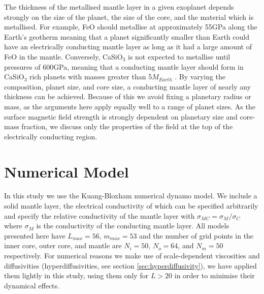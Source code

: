 The thickness of the metallised mantle layer in a given exoplanet depends strongly on the size of the planet, the size of the core, and the material which is metallised. For example, FeO should metallise at approximately 55GPa along the Earth's geotherm \citep{ohta2012} meaning that a planet significantly smaller than Earth could have an electrically conducting mantle layer as long as it had a large amount of FeO in the mantle. Conversely, CaSiO$_{3}$ is not expected to metallise until pressures of 600GPa, meaning that a conducting mantle layer should form in CaSiO$_{3}$ rich planets with masses greater than 5$M_{Earth}$ \citep{tsuchiya2011}. By varying the composition, planet size, and core size, a conducting mantle layer of nearly any thickness can be achieved. Because of this we avoid fixing a planetary radius or mass, as the arguments here apply equally well to a range of planet sizes. As the surface magnetic field strength is strongly dependent on planetary size and core-mass fraction, we discuss only the properties of the field at the top of the electrically conducting region.
 
\section{Numerical Model}
In this study we use the Kuang-Bloxham numerical dynamo model. We include a solid mantle layer, the electrical conductivity of which can be specified arbitrarily and specify the relative conductivity of the mantle layer with $\sigma_{MC}=\sigma_{M}/\sigma_{C}$ where $\sigma_{M}$ is the conductivity of the conducting mantle layer. All models presented here have $L_{max}=56$, $m_{max}=53$ and the number of grid points in the inner core, outer core, and mantle are $N_{i}=50$, $N_{o}=64$, and $N_{m}=50$ respectively. For numerical reasons we make use of scale-dependent viscosities and diffusivities (hyperdiffusivities, see section \ref{sec:hyperdiffusivity}), we have applied them lightly in this study, using them only for $L>20$ in order to minimise their dynamical effects.

